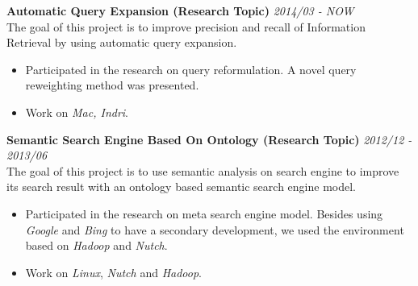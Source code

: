 \documentclass[a4paper]{article}
\newenvironment{changemargin}[2]{%
  \begin{list}{}{%
    \setlength{\topsep}{0pt}%
    \setlength{\leftmargin}{#1}%
    \setlength{\rightmargin}{#2}%
    \setlength{\listparindent}{\parindent}%
    \setlength{\itemindent}{\parindent}%
    \setlength{\parsep}{\parskip}%
  }%
  \item[]}{\end{list}
}
\newenvironment{body} {
	\vspace*{-16pt}
	\begin{changemargin}{-0.25in}{-0.5in}
  }	
	{\end{changemargin}
}
\begin{document}
\begin{body}
	\vspace{14pt}
	
	{\textbf{Automatic Query Expansion (Research Topic)}} \hfill \emph{2014/03 - NOW}\\
	The goal of this project is to improve precision and recall of Information Retrieval by using automatic query expansion.\\
	\vspace*{-6pt}
	\begin{itemize} \itemsep -0pt  %
		\item Participated in the research on query reformulation. A novel query reweighting  method was presented.\\
	\end{itemize}
	\vspace*{-12pt}
	\begin{itemize} \itemsep -0pt  %
		\item Work on \emph{Mac, Indri}.\\
	\end{itemize}
	
	{\textbf{Semantic Search Engine Based On Ontology (Research Topic)}}{} \hfill \emph{2012/12 - 2013/06}\\
	The goal of this project is to use semantic analysis on search engine to improve its search result with an ontology based semantic search engine model.\\
	\vspace*{-6pt}
	\begin{itemize} \itemsep -0pt  %
		\item Participated in the research on meta search engine model. Besides using \emph{Google} and \emph{Bing} to have a secondary development, we used the environment based on \emph{Hadoop} and \emph{Nutch}.\\
	\end{itemize}
	\vspace*{-12pt}
	\begin{itemize} \itemsep -0pt  %
		\item Work on \emph{Linux}, \emph{Nutch} and \emph{Hadoop}.\\
	\end{itemize}
	

\end{body}
\end{document}
